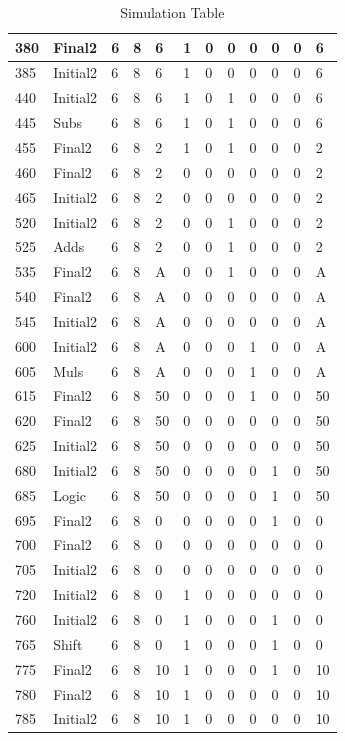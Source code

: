 \documentclass[12pt]{article}
\begin{document}
\begin{table}[]
\begin{tabular}{|l|l|l|l|l|l|l|l|l|l|l|l|}
        \hline
        380 & Final2 & 6 & 8&6&1&0&0&0&0&0&6\\
        \hline
        385 & Initial2 & 6 & 8&6&1&0&0&0&0&0&6\\
        \hline
        440 & Initial2 & 6 & 8&6&1&0&1&0&0&0&6\\
        \hline
        445 & Subs & 6 & 8&6&1&0&1&0&0&0&6\\
        \hline
        455 & Final2 & 6 & 8&2&1&0&1&0&0&0&2\\
        \hline
        460 & Final2 & 6 & 8&2&0&0&0&0&0&0&2\\
        \hline
        465 & Initial2 & 6 & 8&2&0&0&0&0&0&0&2\\
        \hline
        520 & Initial2 & 6 & 8&2&0&0&1&0&0&0&2\\
        \hline
        525 & Adds& 6 & 8&2&0&0&1&0&0&0&2\\
        \hline
        535 & Final2& 6 & 8&A&0&0&1&0&0&0&A\\
        \hline
        540 & Final2& 6 & 8&A&0&0&0&0&0&0&A\\
        \hline
        545 & Initial2& 6 & 8&A&0&0&0&0&0&0&A\\
        \hline
        600 & Initial2& 6 & 8&A&0&0&0&1&0&0&A\\
        \hline
        605 & Muls& 6 & 8&A&0&0&0&1&0&0&A\\
        \hline
        615 & Final2& 6 & 8&50&0&0&0&1&0&0&50\\
        \hline
        620 & Final2& 6 & 8&50&0&0&0&0&0&0&50\\
        \hline
        625 & Initial2& 6 & 8&50&0&0&0&0&0&0&50\\
        \hline
        680 & Initial2& 6 & 8&50&0&0&0&0&1&0&50\\
        \hline
        685 & Logic& 6 & 8&50&0&0&0&0&1&0&50\\
        \hline
        695 & Final2& 6 & 8&0&0&0&0&0&1&0&0\\
        \hline
        700 & Final2& 6 & 8&0&0&0&0&0&0&0&0\\
        \hline
        705 & Initial2& 6 & 8&0&0&0&0&0&0&0&0\\
        \hline
        720 & Initial2& 6 & 8&0&1&0&0&0&0&0&0\\
        \hline
        760 & Initial2& 6 & 8&0&1&0&0&0&1&0&0\\
        \hline
        765 & Shift& 6 & 8&0&1&0&0&0&1&0&0\\
        \hline
        775 & Final2& 6 & 8&10&1&0&0&0&1&0&10\\
        \hline
        780 & Final2& 6 & 8&10&1&0&0&0&0&0&10\\
        \hline
        785 & Initial2& 6 & 8&10&1&0&0&0&0&0&10\\
        \hline
        
    \end{tabular}
    \caption{Simulation Table}
    \label{tab:simulation}
     
\end{table}
\end{document}

